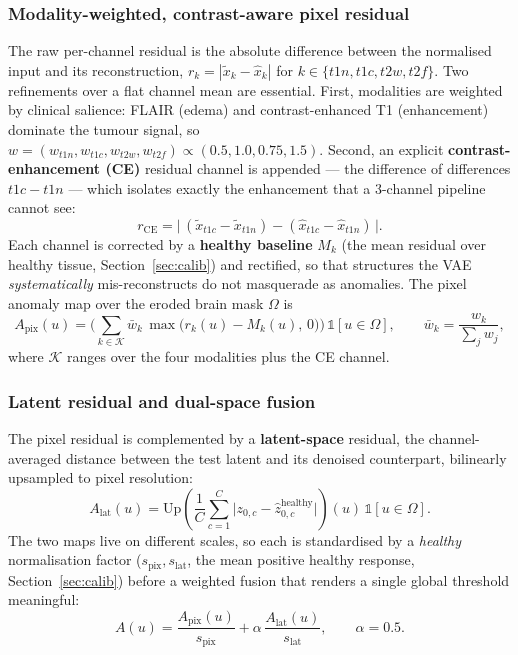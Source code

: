 \documentclass[12pt, a4paper]{article}
\begin{document}
\subsubsection{Modality-weighted, contrast-aware pixel residual}
The raw per-channel residual is the absolute difference between the normalised input and its reconstruction, $r_k = |\tilde{x}_k - \hat{x}_k|$ for $k\in\{t1n,t1c,t2w,t2f\}$. Two refinements over a flat channel mean are essential. First, modalities are weighted by clinical salience: FLAIR (edema) and contrast-enhanced T1 (enhancement) dominate the tumour signal, so $w = (w_{t1n}, w_{t1c}, w_{t2w}, w_{t2f}) \propto (0.5, 1.0, 0.75, 1.5)$. Second, an explicit \textbf{contrast-enhancement (CE)} residual channel is appended — the difference of differences $t1c - t1n$ — which isolates exactly the enhancement that a 3-channel pipeline cannot see:
\begin{equation}
    r_{\text{CE}} = \big|\,(\tilde{x}_{t1c} - \tilde{x}_{t1n}) - (\hat{x}_{t1c} - \hat{x}_{t1n})\,\big|.
\end{equation}
Each channel is corrected by a \textbf{healthy baseline} $M_k$ (the mean residual over healthy tissue, Section~\ref{sec:calib}) and rectified, so that structures the VAE \emph{systematically} mis-reconstructs do not masquerade as anomalies. The pixel anomaly map over the eroded brain mask $\Omega$ is
\begin{equation}
    A_{\text{pix}}(u) = \Bigg(\sum_{k\in\mathcal{K}} \bar{w}_k\,\max\!\big(r_k(u) - M_k(u),\,0\big)\Bigg)\,\mathbb{1}[u\in\Omega],
    \qquad \bar{w}_k = \frac{w_k}{\sum_j w_j},
\end{equation}
where $\mathcal{K}$ ranges over the four modalities plus the CE channel.

\subsubsection{Latent residual and dual-space fusion}
The pixel residual is complemented by a \textbf{latent-space} residual, the channel-averaged distance between the test latent and its denoised counterpart, bilinearly upsampled to pixel resolution:
\begin{equation}
    A_{\text{lat}}(u) = \mathrm{Up}\!\left(\frac{1}{C}\sum_{c=1}^{C} \big| z_{0,c} - \hat{z}^{\text{healthy}}_{0,c}\big|\right)(u)\,\mathbb{1}[u\in\Omega].
\end{equation}
The two maps live on different scales, so each is standardised by a \emph{healthy} normalisation factor ($s_{\text{pix}}, s_{\text{lat}}$, the mean positive healthy response, Section~\ref{sec:calib}) before a weighted fusion that renders a single global threshold meaningful:
\begin{equation}
    A(u) = \frac{A_{\text{pix}}(u)}{s_{\text{pix}}} + \alpha\,\frac{A_{\text{lat}}(u)}{s_{\text{lat}}}, \qquad \alpha = 0.5 .
    \label{eq:fusion}
\end{equation}
\end{document}
